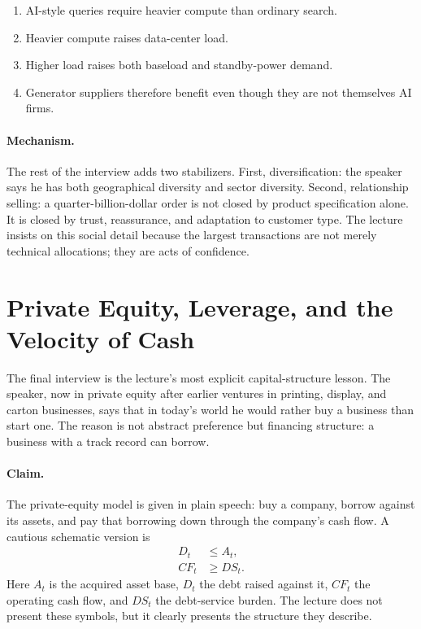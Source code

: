 \begin{enumerate}
\item AI-style queries require heavier compute than ordinary search.
\item Heavier compute raises data-center load.
\item Higher load raises both baseload and standby-power demand.
\item Generator suppliers therefore benefit even though they are not themselves AI firms.
\end{enumerate}

\paragraph{Mechanism.} The rest of the interview adds two stabilizers. First, diversification: the speaker says he has both geographical diversity and sector diversity. Second, relationship selling: a quarter-billion-dollar order is not closed by product specification alone. It is closed by trust, reassurance, and adaptation to customer type. The lecture insists on this social detail because the largest transactions are not merely technical allocations; they are acts of confidence.

\section{Private Equity, Leverage, and the Velocity of Cash}

The final interview is the lecture's most explicit capital-structure lesson. The speaker, now in private equity after earlier ventures in printing, display, and carton businesses, says that in today's world he would rather buy a business than start one. The reason is not abstract preference but financing structure: a business with a track record can borrow.

\paragraph{Claim.} The private-equity model is given in plain speech: buy a company, borrow against its assets, and pay that borrowing down through the company's cash flow. A cautious schematic version is
\begin{align}
D_t &\le A_t,\\
CF_t &\ge DS_t.
\end{align}
Here \(A_t\) is the acquired asset base, \(D_t\) the debt raised against it, \(CF_t\) the operating cash flow, and \(DS_t\) the debt-service burden. The lecture does not present these symbols, but it clearly presents the structure they describe.

